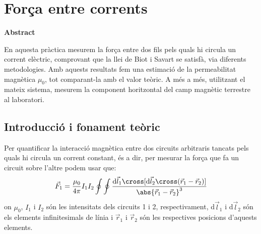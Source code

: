 \documentclass[a4paper,10.5pt]{report}
\newenvironment{chapterabstract}{
	\begin{center}
		\bfseries Abstract
	\end{center}
	\quotation
}{\endquotation}
\begin{document}
\chapter{Força entre corrents}
\begin{chapterabstract}
	En aquesta pràctica mesurem la força entre dos fils pels quals hi circula un corrent elèctric, comprovant que la llei de Biot i Savart se satisfà, via diferents metodologies. Amb aquests resultats fem una estimació de la permeabilitat magnètica $\mu_0$, tot comparant-la amb el valor teòric. A més a més, utilitzant el mateix sistema, mesurem la component horitzontal del camp magnètic terrestre al laboratori.
\end{chapterabstract}
\section{Introducció i fonament teòric}
Per quantificar la interacció magnètica entre dos circuits arbitraris tancats pels quals hi circula un corrent constant, és a dir, per mesurar la força que fa un circuit sobre l'altre podem usar que:
\begin{equation}
	\vec{F}_1 = \frac{\mu_0}{4\pi}I_1I_2\oint \oint \frac{\mathrm{d}\vec{l}_1\cross[\mathrm{d}\vec{l}_2 \cross (\vec{r}_1-\vec{r}_2)]}{\abs{\vec{r}_1 - \vec{r}_2}^3}\label{eq:2.1}
\end{equation}
on $\mu_0$, $I_1$ i $I_2$ són les intensitats dels circuits 1 i 2, respectivament, d$\vec{l}_1$ i d$\vec{l}_2$ són els elements infinitesimals de línia i $\vec{r}_1$ i $\vec{r}_2$ són les respectives posicions d'aquests elements.
\end{document}
